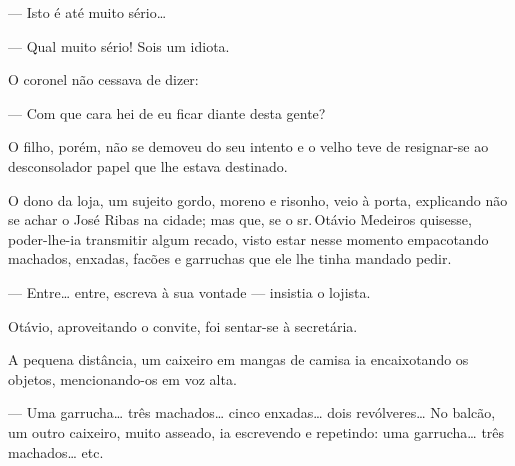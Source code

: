 {--- Isto é até muito sério\ldots{}

--- Qual muito sério! Sois um idiota.


O coronel não cessava de dizer:

--- Com que cara hei de eu ficar diante desta gente?

O filho, porém, não se demoveu do seu intento e o velho
teve de resignar-se ao desconsolador papel que lhe estava
destinado.




O dono da loja, um sujeito gordo, moreno e risonho, veio
à porta, explicando não se achar o José Ribas na cidade; mas
que, se o sr.\,Otávio Medeiros quisesse, poder-lhe-ia
transmitir algum recado, visto estar nesse momento empacotando machados,
enxadas, facões e garruchas que ele lhe tinha mandado pedir.

--- Entre\ldots{} entre, escreva à sua vontade ---
insistia o lojista.

Otávio, aproveitando o convite, foi sentar-se à
secretária.

A pequena distância, um caixeiro em mangas de camisa ia
encaixotando os objetos, mencionando-os em voz alta.

--- Uma garrucha\ldots{} três machados\ldots{} cinco
enxadas\ldots{} dois revólveres\ldots{} No balcão, um outro caixeiro,
muito asseado, ia escrevendo e repetindo: uma garrucha\ldots{}
três machados\ldots{} etc.



}
